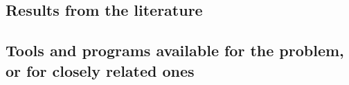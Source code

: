 \documentclass[a4paper,11pt]{article}
\begin{document}
\subsection{Results from the literature}

\subsection{Tools and programs available for the problem, or for closely related ones}




\end{document}
